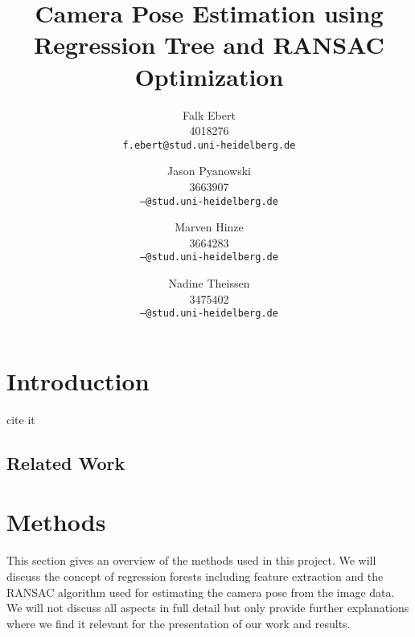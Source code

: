 \documentclass[final]{cvpr}
\begin{document}
\title{Camera Pose Estimation using Regression Tree and RANSAC Optimization}

\author{Falk Ebert\\
4018276\\
{\tt\small f.ebert@stud.uni-heidelberg.de}
\and
Jason Pyanowski\\
3663907\\
{\tt\small ---@stud.uni-heidelberg.de}
\and
Marven Hinze\\
3664283\\
{\tt\small ---@stud.uni-heidelberg.de}
\and
Nadine Theissen\\
3475402\\
{\tt\small ---@stud.uni-heidelberg.de}
}

\maketitle


\begin{abstract}
   
\end{abstract}

\section{Introduction}
cite it~\cite{shotton2013}



\subsection{Related Work}


\section{Methods}
This section gives an overview of the methods used in this project. We will discuss
the concept of regression forests including feature extraction and the RANSAC algorithm
used for estimating the camera pose from the image data. We will not discuss all aspects
in full detail but only provide further explanations where we find it relevant
for the presentation of our work and results.
\end{document}
